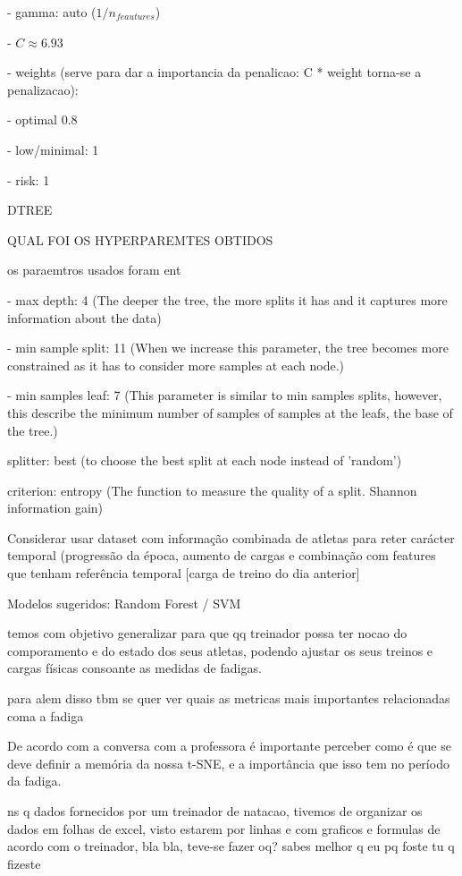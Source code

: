 \documentclass[conference]{IEEEtran}
\begin{document}
- gamma: auto ($1 / n_{feautures}$)

- $C \approx 6.93$

- weights (serve para dar a importancia da penalicao: C * weight torna-se a penalizacao): 

   - optimal 0.8

   - low/minimal: 1

   - risk: 1

DTREE

QUAL FOI OS HYPERPAREMTES OBTIDOS


os paraemtros usados foram ent

- max depth: 4 (The deeper the tree, the more splits it has and it captures more information about the data)

- min sample split: 11 (When we increase this parameter, the tree becomes more constrained as it has to consider more samples at each node.)

- min samples leaf: 7 (This parameter is similar to min samples splits, however, this describe the minimum number of samples of samples at the leafs, the base of the tree.)

splitter: best (to choose the best split at each node instead of 'random')

criterion: entropy (The function to measure the quality of a split. Shannon information gain)


Considerar usar dataset com informação combinada de atletas para reter carácter temporal (progressão da época, aumento de cargas e combinação com features que tenham referência temporal [carga de treino do dia anterior]

Modelos sugeridos: Random Forest / SVM

temos com objetivo generalizar para que qq treinador possa ter nocao do comporamento e do estado dos seus atletas, podendo ajustar os seus treinos e cargas físicas consoante as medidas de fadigas.

para alem disso tbm se quer ver quais as metricas mais importantes relacionadas coma a fadiga

De acordo com a conversa com a professora é importante perceber como é que se deve definir a memória da nossa t-SNE, e a importância que isso tem no período da fadiga.

ns q dados fornecidos por um treinador de natacao, tivemos de organizar os dados em folhas de excel, visto estarem por linhas e com graficos e formulas de acordo com o treinador, bla bla, teve-se fazer oq? sabes melhor q eu pq foste tu q fizeste
\end{document}

